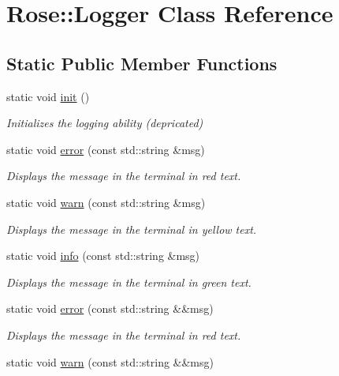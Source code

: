\hypertarget{classRose_1_1Logger}{}\section{Rose\+::Logger Class Reference}
\label{classRose_1_1Logger}
\subsection*{Static Public Member Functions}
\begin{DoxyCompactItemize}
\item 
static void \mbox{\hyperlink{classRose_1_1Logger_af47728667625563c478e9286237fee94}{init}} ()
\begin{DoxyCompactList}\small\item\em Initializes the logging ability (depricated) \end{DoxyCompactList}\item 
static void \mbox{\hyperlink{classRose_1_1Logger_a5db9f7e908e98b211bfb841b58610530}{error}} (const std\+::string \&msg)
\begin{DoxyCompactList}\small\item\em Displays the message in the terminal in red text. \end{DoxyCompactList}\item 
static void \mbox{\hyperlink{classRose_1_1Logger_ab745f1411496f7226630eb91a54d444b}{warn}} (const std\+::string \&msg)
\begin{DoxyCompactList}\small\item\em Displays the message in the terminal in yellow text. \end{DoxyCompactList}\item 
static void \mbox{\hyperlink{classRose_1_1Logger_af83ea76e9be1d077d1802527080d0b5f}{info}} (const std\+::string \&msg)
\begin{DoxyCompactList}\small\item\em Displays the message in the terminal in green text. \end{DoxyCompactList}\item 
static void \mbox{\hyperlink{classRose_1_1Logger_ac7392ff1d51a6c25cb772fbed791f906}{error}} (const std\+::string \&\&msg)
\begin{DoxyCompactList}\small\item\em Displays the message in the terminal in red text. \end{DoxyCompactList}\item 
static void \mbox{\hyperlink{classRose_1_1Logger_aa950e16771d3c0b62dfafe6f39088d86}{warn}} (const std\+::string \&\&msg)

\end{DoxyCompactItemize}
